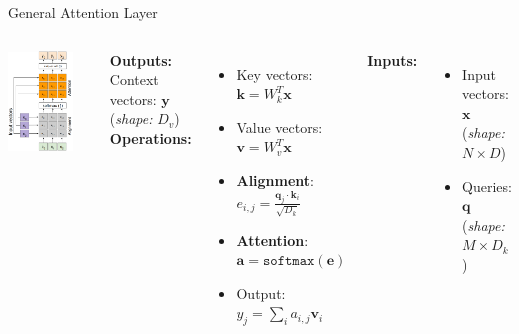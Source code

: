 \documentclass[serif, aspectratio=169]{beamer}
\begin{document}
\begin{frame}{General Attention Layer}
	\begin{columns}
		
		\includegraphics[width=0.8\textwidth]{pic/General-Attention-Layer.png}
		
		\textbf{Outputs:} \\
		Context vectors: $\mathbf{y}$ (\textit{shape: } $D_v$) \\[1em]
		
		\textbf{Operations:}
		\begin{itemize}
			\item Key vectors: $\mathbf{k} = W_k^T \mathbf{x}$
			\item Value vectors: $\mathbf{v} = W_v^T \mathbf{x}$
			\item \textbf{Alignment}: $e_{i,j} = \frac{\mathbf{q}_j \cdot \mathbf{k}_i}{\sqrt{D_k}}$
			\item \textbf{Attention}: $\mathbf{a} = \texttt{softmax}(\mathbf{e})$
			\item Output: $y_j = \sum_i a_{i,j} \mathbf{v}_i$
		\end{itemize}
		
		\textbf{Inputs:}
		\begin{itemize}
			\item Input vectors: $\mathbf{x}$ (\textit{shape: } $N \times D$)
			\item Queries: $\mathbf{q}$ (\textit{shape: } $M \times D_k$)
		\end{itemize}
	\end{columns}
\end{frame}
\end{document}
